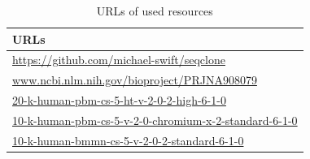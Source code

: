 \begin{table}[h]
\centering
\begin{tabularx}{\textwidth}{|X|}
\hline
\textbf{URLs} \\
\hline
\url{https://github.com/michael-swift/seqclone} \\
\hline
\url{www.ncbi.nlm.nih.gov/bioproject/PRJNA908079} \\
\hline
\url{20-k-human-pbm-cs-5-ht-v-2-0-2-high-6-1-0} \\
\hline
\url{10-k-human-pbm-cs-5-v-2-0-chromium-x-2-standard-6-1-0} \\
\hline
\url{10-k-human-bmmn-cs-5-v-2-0-2-standard-6-1-0} \\
\hline
\end{tabularx}
\caption[URLs of Public 10X genomics datasets used]{URLs of used resources}
\label{tab:URLs}
\end{table}

















